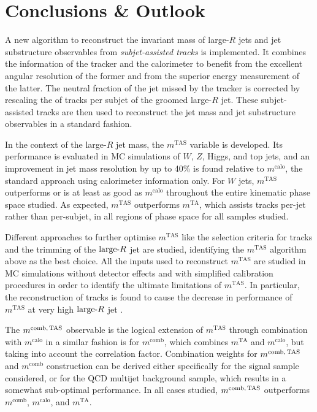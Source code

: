 \documentclass[UKenglish,texlive=2013]{\ATLASLATEXPATH atlasdoc}
\newcommand{\mta}{\ensuremath{m^\textrm{TA}}\xspace}
\newcommand{\mtas}{\ensuremath{m^\textrm{TAS}}\xspace}
\newcommand{\mcal}{\ensuremath{m^\textrm{calo}}\xspace}
\newcommand{\mcalo}{\ensuremath{m^\textrm{calo}}\xspace}
\newcommand{\mcomb}{\ensuremath{m^\textrm{comb}}\xspace}
\newcommand{\mcombtas}{\ensuremath{m^\textrm{comb,\,TAS}}\xspace}
\newcommand{\larger}{\ensuremath{\textrm{large}\hbox{-}R}\xspace}
\begin{document}
\section{Conclusions \& Outlook}
\label{sec:conclusions}
A new algorithm to reconstruct the invariant mass of large-$R$ jets and jet substructure observables from {\em subjet-assisted tracks} is implemented. It combines the information of the tracker and the calorimeter to benefit from the excellent angular resolution of the former and from the superior energy measurement of the latter. The neutral fraction of the jet missed by the tracker is corrected by rescaling the \pt of tracks per subjet of the groomed large-$R$ jet. These subjet-assisted tracks are then used to reconstruct the jet mass and jet substructure observables in a standard fashion.

In the context of the large-$R$ jet mass, the \mtas variable is developed. Its performance is evaluated  in MC simulations of $W$, $Z$, Higgs, and top jets, and an improvement in jet mass resolution by up to 40\% is found relative to  \mcalo, the standard approach using calorimeter information only. For $W$ jets, \mtas outperforms or is at least as good as \mcalo throughout the entire kinematic phase space studied. As expected, \mtas outperforms \mta, which assists tracks per-jet rather than per-subjet, in all regions of phase space for all samples studied. 

Different approaches to further optimise \mtas like the selection criteria for tracks and the trimming of the \larger jet are studied, identifying the \mtas algorithm above as the best choice. All the inputs used to reconstruct \mtas are studied in MC simulations without detector effects and with simplified calibration procedures in order to identify the ultimate limitations of \mtas. In particular, the \pt reconstruction of tracks is found to cause the decrease in performance of \mtas at very high \larger jet \pt.

The $\mcombtas$ observable is the logical extension of $\mtas$ through combination with \mcalo in a similar fashion is for \mcomb, which combines \mta and \mcalo, but taking into account the correlation factor. Combination weights for \mcombtas and \mcomb construction can be derived either specifically for the signal sample considered, or for the QCD multijet background sample, which results in a somewhat sub-optimal performance. In all cases studied, \mcombtas outperforms $\mcomb$, $\mcal$, and $\mta$.
\end{document}
